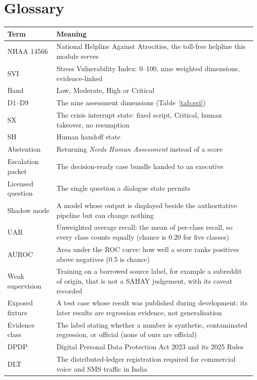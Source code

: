 \documentclass[11pt,a4paper]{article}
\begin{document}
\section{Glossary}
\begin{tabularx}{\linewidth}{@{}>{\raggedright\arraybackslash}p{3.2cm}X@{}}
\toprule
Term & Meaning \\
\midrule
NHAA 14566 & National Helpline Against Atrocities, the toll-free helpline this module serves \\
SVI & Stress Vulnerability Index: 0--100, nine weighted dimensions, evidence-linked \\
Band & Low, Moderate, High or Critical \\
D1--D9 & The nine assessment dimensions (Table~\ref{tab:svi}) \\
SX & The crisis interrupt state: fixed script, Critical, human takeover, no resumption \\
SH & Human handoff state \\
Abstention & Returning \emph{Needs Human Assessment} instead of a score \\
Escalation packet & The decision-ready case bundle handed to an executive \\
Licensed question & The single question a dialogue state permits \\
Shadow mode & A model whose output is displayed beside the authoritative pipeline but can change
nothing \\
UAR & Unweighted average recall: the mean of per-class recall, so every class counts equally (chance
is 0.20 for five classes) \\
AUROC & Area under the ROC curve: how well a score ranks positives above negatives (0.5 is chance) \\
Weak supervision & Training on a borrowed source label, for example a subreddit of origin, that is not
a SAHAY judgement, with its caveat recorded \\
Exposed fixture & A test case whose result was published during development; its later results are
regression evidence, not generalisation \\
Evidence class & The label stating whether a number is synthetic, contaminated regression, or
official (none of ours are official) \\
DPDP & Digital Personal Data Protection Act 2023 and its 2025 Rules \\
DLT & The distributed-ledger registration required for commercial voice and SMS traffic in India \\
\bottomrule
\end{tabularx}
\end{document}
